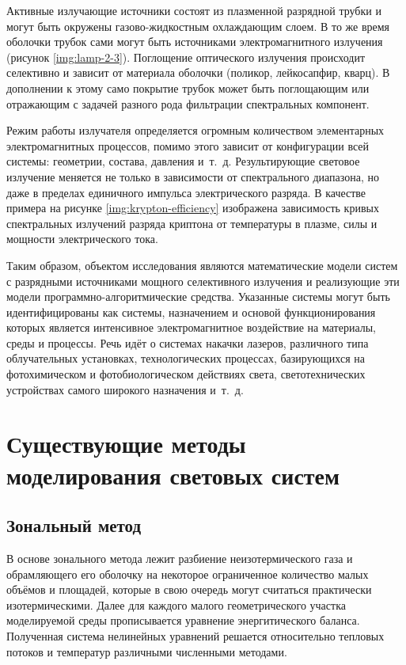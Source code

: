 Активные излучающие источники состоят из плазменной разрядной трубки и могут быть окружены газово-жидкостным охлаждающим слоем.
В то же время оболочки трубок сами могут быть источниками электромагнитного излучения (рисунок \ref{img:lamp-2-3}).
Поглощение оптического излучения происходит селективно и зависит от материала оболочки (поликор, лейкосапфир, кварц).
В дополнении к этому само покрытие трубок может быть поглощающим или отражающим с задачей разного рода фильтрации спектральных компонент.

Режим работы излучателя определяется огромным количеством элементарных электромагнитных процессов, помимо этого зависит от конфигурации всей системы: геометрии, состава, давления и~т.~д.
Результирующие световое излучение меняется не только в зависимости от спектрального диапазона, но даже в пределах единичного импульса электрического разряда.
В качестве примера на рисунке \ref{img:krypton-efficiency} изображена зависимость кривых спектральных излучений разряда криптона от температуры в плазме, силы и мощности электрического тока.

Таким образом, объектом исследования являются математические модели систем с разрядными источниками мощного селективного излучения и реализующие эти модели программно-алгоритмические средства.
Указанные системы могут быть идентифицированы как системы, назначением и основой функционирования которых является интенсивное электромагнитное воздействие на материалы, среды и процессы.
Речь идёт о системах накачки лазеров, различного типа облучательных установках, технологических процессах, базирующихся на фотохимическом и фотобиологическом действиях света, светотехнических устройствах самого широкого назначения и~т.~д.

\section{Существующие методы моделирования световых систем}

\subsection{Зональный метод}

В основе зонального метода лежит разбиение неизотермического газа и обрамляющего его оболочку на некоторое ограниченное количество малых объёмов и площадей, которые в свою очередь могут считаться практически изотермическими.
Далее для каждого малого геометрического участка моделируемой среды прописывается уравнение энергитического баланса.
Полученная система нелинейных уравнений решается относительно тепловых потоков и температур различными численными методами.

